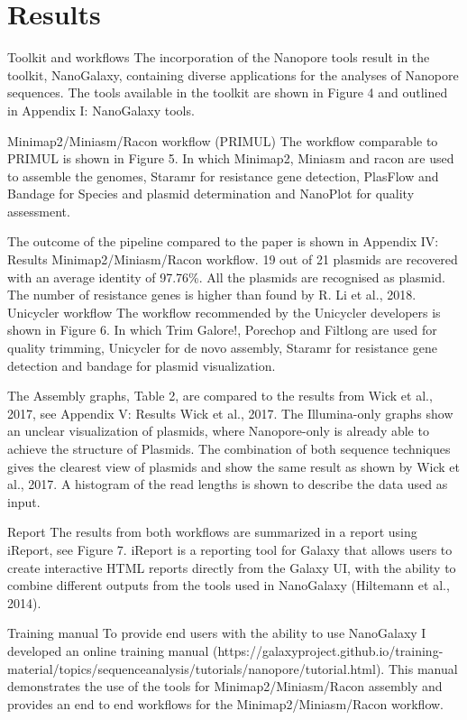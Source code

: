 \documentclass[a4paper,num-refs]{oup-contemporary}
\begin{document}
\section{Results}
Toolkit and workflows
The incorporation of the Nanopore tools result in the toolkit, NanoGalaxy, containing diverse
applications for the analyses of Nanopore sequences. The tools available in the toolkit are shown in
Figure 4 and outlined in Appendix I: NanoGalaxy tools.

Minimap2/Miniasm/Racon workflow (PRIMUL)
The workflow comparable to PRIMUL is shown in Figure 5. In which Minimap2, Miniasm and racon
are used to assemble the genomes, Staramr for resistance gene detection, PlasFlow and Bandage for
Species and plasmid determination and NanoPlot for quality assessment.

The outcome of the pipeline compared to the paper is shown in Appendix IV: Results
Minimap2/Miniasm/Racon workflow. 19 out of 21 plasmids are recovered with an average identity
of 97.76\%. All the plasmids are recognised as plasmid. The number of resistance genes is higher than
found by R. Li et al., 2018.
Unicycler workflow
The workflow recommended by the Unicycler developers is shown in Figure 6. In which Trim Galore!,
Porechop and Filtlong are used for quality trimming, Unicycler for de novo assembly, Staramr for
resistance gene detection and bandage for plasmid visualization.

The Assembly graphs, Table 2, are compared to the results from Wick et al., 2017, see Appendix V:
Results Wick et al., 2017. The Illumina-only graphs show an unclear visualization of plasmids, where
Nanopore-only is already able to achieve the structure of Plasmids. The combination of both
sequence techniques gives the clearest view of plasmids and show the same result as shown by Wick
et al., 2017. A histogram of the read lengths is shown to describe the data used as input.

Report
The results from both workflows are summarized in a report using iReport, see Figure 7. iReport is a
reporting tool for Galaxy that allows users to create interactive HTML reports directly from the
Galaxy UI, with the ability to combine different outputs from the tools used in NanoGalaxy
(Hiltemann et al., 2014).

Training manual
To provide end users with the ability to use NanoGalaxy I developed an online training manual
(https://galaxyproject.github.io/training-material/topics/sequenceanalysis/tutorials/nanopore/tutorial.html). This manual demonstrates the use of the tools for
Minimap2/Miniasm/Racon assembly and provides an end to end workflows for the
Minimap2/Miniasm/Racon workflow.
\end{document}
